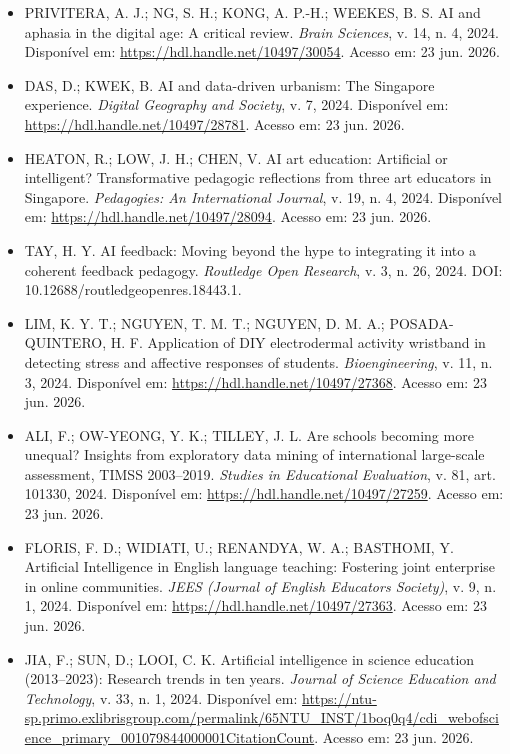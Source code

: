 \documentclass[english]{textolivre}
\begin{document}
\begin{itemize}
\item[] PRIVITERA, A. J.; NG, S. H.; KONG, A. P.-H.; WEEKES, B. S. AI and aphasia in the digital age: A critical review. \textit{Brain Sciences}, v. 14, n. 4, 2024. Disponível em: \url{https://hdl.handle.net/10497/30054}. Acesso em: 23 jun. 2026.

\item[] DAS, D.; KWEK, B. AI and data-driven urbanism: The Singapore experience. \textit{Digital Geography and Society}, v. 7, 2024. Disponível em: \url{https://hdl.handle.net/10497/28781}. Acesso em: 23 jun. 2026.

\item[] HEATON, R.; LOW, J. H.; CHEN, V. AI art education: Artificial or intelligent? Transformative pedagogic reflections from three art educators in Singapore. \textit{Pedagogies: An International Journal}, v. 19, n. 4, 2024. Disponível em: \url{https://hdl.handle.net/10497/28094}. Acesso em: 23 jun. 2026.

\item[] TAY, H. Y. AI feedback: Moving beyond the hype to integrating it into a coherent feedback pedagogy. \textit{Routledge Open Research}, v. 3, n. 26, 2024. DOI: 10.12688/routledgeopenres.18443.1.

\item[] LIM, K. Y. T.; NGUYEN, T. M. T.; NGUYEN, D. M. A.; POSADA-QUINTERO, H. F. Application of DIY electrodermal activity wristband in detecting stress and affective responses of students. \textit{Bioengineering}, v. 11, n. 3, 2024. Disponível em: \url{https://hdl.handle.net/10497/27368}. Acesso em: 23 jun. 2026.

\item[] ALI, F.; OW-YEONG, Y. K.; TILLEY, J. L. Are schools becoming more unequal? Insights from exploratory data mining of international large-scale assessment, TIMSS 2003--2019. \textit{Studies in Educational Evaluation}, v. 81, art. 101330, 2024. Disponível em: \url{https://hdl.handle.net/10497/27259}. Acesso em: 23 jun. 2026.

\item[] FLORIS, F. D.; WIDIATI, U.; RENANDYA, W. A.; BASTHOMI, Y. Artificial Intelligence in English language teaching: Fostering joint enterprise in online communities. \textit{JEES (Journal of English Educators Society)}, v. 9, n. 1, 2024. Disponível em: \url{https://hdl.handle.net/10497/27363}. Acesso em: 23 jun. 2026.

\item[] JIA, F.; SUN, D.; LOOI, C. K. Artificial intelligence in science education (2013--2023): Research trends in ten years. \textit{Journal of Science Education and Technology}, v. 33, n. 1, 2024. Disponível em: \url{https://ntu-sp.primo.exlibrisgroup.com/permalink/65NTU_INST/1boq0q4/cdi_webofscience_primary_001079844000001CitationCount}. Acesso em: 23 jun. 2026.


\end{itemize}
\end{document}
